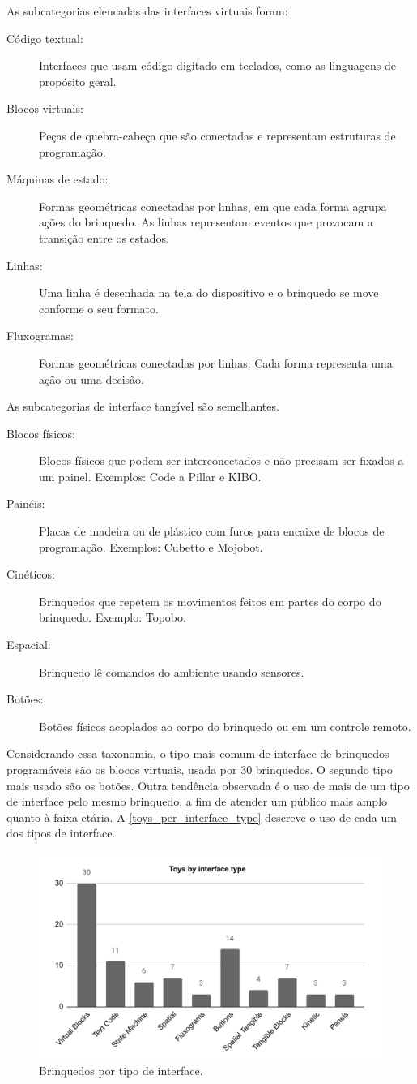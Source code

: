 {As subcategorias elencadas das interfaces virtuais foram: 
\begin{description}
    \item[Código textual: ] Interfaces que usam código digitado em teclados, como as linguagens de propósito geral. 
    \item[Blocos virtuais: ] Peças de quebra-cabeça que são conectadas e representam estruturas de programação.
    \item[Máquinas de estado: ] Formas geométricas conectadas por linhas, em que cada forma agrupa ações do brinquedo. As linhas representam eventos que provocam a transição entre os estados.
    \item[Linhas: ] Uma linha é desenhada na tela do dispositivo e o brinquedo se move conforme o seu formato.
    \item[Fluxogramas: ] Formas geométricas conectadas por linhas. Cada forma representa uma ação ou uma decisão.
\end{description}

As subcategorias de interface tangível são semelhantes.

\begin{description}
    \item[Blocos físicos: ] Blocos físicos que podem ser interconectados e não precisam ser fixados a um painel. Exemplos: Code a Pillar e KIBO. 
    \item[Painéis: ] Placas de madeira ou de plástico com furos para encaixe de blocos de programação. Exemplos: Cubetto e Mojobot.
    \item[Cinéticos: ] Brinquedos que repetem os movimentos feitos em partes do corpo do brinquedo. Exemplo: Topobo.
    \item[Espacial: ] Brinquedo lê comandos do ambiente usando sensores.
    \item[Botões: ] Botões físicos acoplados ao corpo do brinquedo ou em um controle remoto.
\end{description}

Considerando essa taxonomia, o tipo mais comum de interface de brinquedos programáveis são os blocos virtuais, usada por 30 brinquedos. O segundo tipo mais usado são os botões. Outra tendência observada é o uso de mais de um tipo de interface pelo mesmo brinquedo, a fim de atender um público mais amplo quanto à faixa etária. A \autoref{toys_per_interface_type} descreve o uso de cada um dos tipos de interface.

\begin{figure}[!htbp]
    \centering
    \includegraphics[width=.6\linewidth,fbox]{figs/toys_per_interface_type.png}
    \caption{Brinquedos por tipo de interface.}
    \label{toys_per_interface_type}
    \sourceauthor
\end{figure}

}
